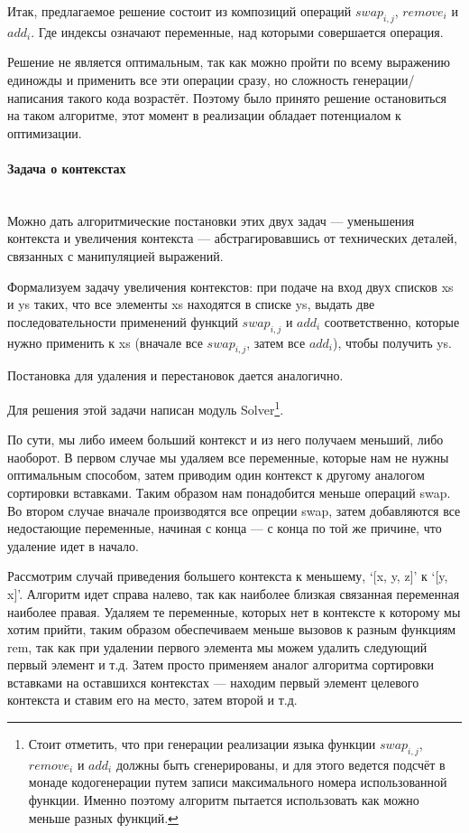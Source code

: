 \hfill

Итак, предлагаемое решение состоит из композиций операций $swap_{i,j}$, $remove_i$ и $add_i$. Где индексы означают переменные, над которыми совершается операция.

Решение не является оптимальным, так как можно пройти по всему выражению единожды и применить все эти операции сразу, но сложность генерации/написания такого кода возрастёт. Поэтому было принято решение остановиться на таком алгоритме, этот момент в реализации обладает потенциалом к оптимизации.

\paragraph{Задача о контекстах} \hspace{0pt} \\

Можно дать алгоритмические постановки этих двух задач --- уменьшения контекста и увеличения контекста --- абстрагировавшись от технических деталей, связанных с манипуляцией выражений.

Формализуем задачу увеличения контекстов: при подаче на вход двух списков xs и ys таких, что все элементы xs находятся в списке ys, выдать две последовательности применений функций $swap_{i,j}$ и $add_i$ соответственно, которые нужно применить к xs (вначале все $swap_{i,j}$, затем все $add_i$), чтобы получить ys.

Постановка для удаления и перестановок дается аналогично.

Для решения этой задачи написан модуль Solver\footnote{Стоит отметить, что при генерации реализации языка функции $swap_{i,j}$, $remove_i$ и $add_i$ должны быть сгенерированы, и для этого ведется подсчёт в монаде кодогенерации путем записи максимального номера использованной функции. Именно поэтому алгоритм пытается использовать как можно меньше разных функций.}.

По сути, мы либо имеем больший контекст и из него получаем меньший, либо наоборот. В первом случае мы удаляем все переменные, которые нам не нужны оптимальным способом, затем приводим один контекст к другому аналогом сортировки вставками. Таким образом нам понадобится меньше операций swap. Во втором случае вначале производятся все опреции swap, затем добавляются все недостающие переменные, начиная с конца --- с конца по той же причине, что удаление идет в начало.

Рассмотрим случай приведения большего контекста к меньшему, `[x, y, z]' к `[y, x]'. Алгоритм идет справа налево, так как наиболее близкая связанная переменная наиболее правая. Удаляем те переменные, которых нет в контексте к которому мы хотим прийти, таким образом обеспечиваем меньше вызовов к разным функциям rem, так как при удалении первого элемента мы можем удалить следующий первый элемент и т.д. Затем просто применяем аналог алгоритма сортировки вставками на оставшихся контекстах --- находим первый элемент целевого контекста и ставим его на место, затем второй и т.д.

